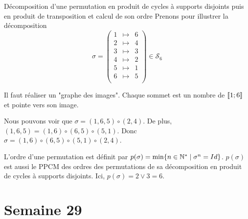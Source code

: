 \documentclass{article}
\renewenvironment{question_kholle}[2][ ]
{
	\subsection{\texorpdfstring{#2}{}}
	\notblank{#1}
	{
		\noindent #1
		\bigbreak
	}
	{}
	\begin{proof}
}
{
	\end{proof}
}
\begin{document}
\begin{question_kholle}
	{Décomposition d'une permutation en produit de cycles à supports disjoints puis en produit de transposition et calcul de son ordre}
	Prenons pour illustrer la décomposition
	\begin{equation*}
		\sigma = \begin{pmatrix}
			1 & \mapsto & 6 \\
			2 & \mapsto & 4 \\
			3 & \mapsto & 3 \\
			4 & \mapsto & 2 \\
			5 & \mapsto & 1 \\
			6 & \mapsto & 5 \\
		\end{pmatrix}
		\in \mathcal{S}_6
	\end{equation*}

	Il faut réaliser un "graphe des images". Chaque sommet est un nombre de $[\![ 1; 6 ]\!]$ et pointe vers son image.

	\begin{figure}[H]
		\centering
	\end{figure}

	Nous pouvons voir que $\sigma = (1, 6, 5) \circ (2, 4)$.
	De plus, $(1, 6, 5) = (1, 6) \circ (6, 5) \circ (5, 1)$.
	Donc $\sigma = (1, 6) \circ (6, 5) \circ (5, 1) \circ (2, 4)$.

	L'ordre d'une permutation est définit par $p(\sigma) = \min \{ n \in \mathbb N^* \;|\; \sigma^n = Id \}$. $p(\sigma)$ est aussi le PPCM des ordres des permutations de sa décomposition en produit de cycles à supports disjoints. Ici, $p(\sigma) = 2 \vee 3 = 6$.
\end{question_kholle}
\pagebreak\section{Semaine 29}
\end{document}
